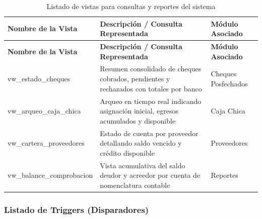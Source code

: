 {
\small
{}
\setlength{\parindent}{0pt}
\begin{xltabular}{\linewidth}{
    >{\raggedright\arraybackslash}p{3.2cm} 
    >{\raggedright\arraybackslash}X 
    >{\raggedright\arraybackslash}p{2.8cm}
}
    \caption{Listado de vistas para consultas y reportes del sistema} \label{tab:cap4_bd_vistas} \\
    \toprule
    \textbf{Nombre de la Vista} & \textbf{Descripción / Consulta Representada} & \textbf{Módulo Asociado} \\
    \midrule
    \endfirsthead

    \toprule
    \textbf{Nombre de la Vista} & \textbf{Descripción / Consulta Representada} & \textbf{Módulo Asociado} \\
    \midrule
    \endhead

    \endfoot
\bottomrule
\endlastfoot

    \textrm{vw\_estado\_cheques} & Resumen consolidado de cheques cobrados, pendientes y rechazados con totales por banco & Cheques Posfechados \\
    \addlinespace
    \textrm{vw\_arqueo\_caja\_chica} & Arqueo en tiempo real indicando asignación inicial, egresos acumulados y disponible & Caja Chica \\
    \addlinespace
    \textrm{vw\_cartera\_proveedores} & Estado de cuenta por proveedor detallando saldo vencido y crédito disponible & Proveedores \\
    \addlinespace
    \textrm{vw\_balance\_comprobacion} & Vista acumulativa del saldo deudor y acreedor por cuenta de nomenclatura contable & Reportes \\
\end{xltabular}
}

\subsubsection{Listado de Triggers (Disparadores)}

